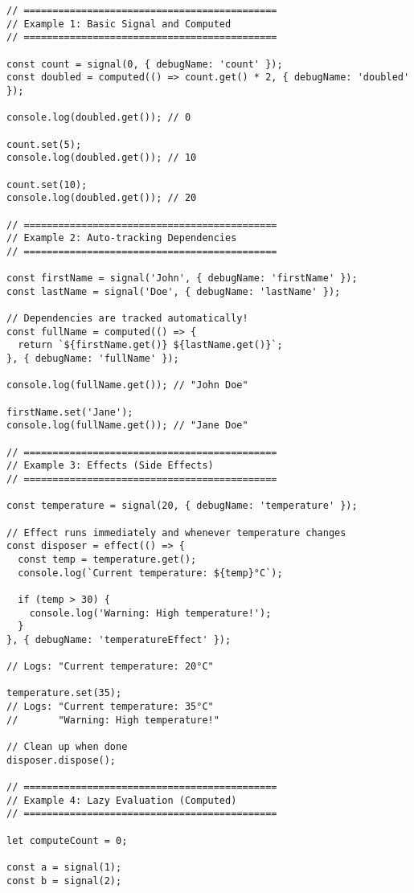 \documentclass[11pt]{article}
\begin{document}
\begin{verbatim}
// ============================================
// Example 1: Basic Signal and Computed
// ============================================

const count = signal(0, { debugName: 'count' });
const doubled = computed(() => count.get() * 2, { debugName: 'doubled' });

console.log(doubled.get()); // 0

count.set(5);
console.log(doubled.get()); // 10

count.set(10);
console.log(doubled.get()); // 20

// ============================================
// Example 2: Auto-tracking Dependencies
// ============================================

const firstName = signal('John', { debugName: 'firstName' });
const lastName = signal('Doe', { debugName: 'lastName' });

// Dependencies are tracked automatically!
const fullName = computed(() => {
  return `${firstName.get()} ${lastName.get()}`;
}, { debugName: 'fullName' });

console.log(fullName.get()); // "John Doe"

firstName.set('Jane');
console.log(fullName.get()); // "Jane Doe"

// ============================================
// Example 3: Effects (Side Effects)
// ============================================

const temperature = signal(20, { debugName: 'temperature' });

// Effect runs immediately and whenever temperature changes
const disposer = effect(() => {
  const temp = temperature.get();
  console.log(`Current temperature: ${temp}°C`);
  
  if (temp > 30) {
    console.log('Warning: High temperature!');
  }
}, { debugName: 'temperatureEffect' });

// Logs: "Current temperature: 20°C"

temperature.set(35);
// Logs: "Current temperature: 35°C"
//       "Warning: High temperature!"

// Clean up when done
disposer.dispose();

// ============================================
// Example 4: Lazy Evaluation (Computed)
// ============================================

let computeCount = 0;

const a = signal(1);
const b = signal(2);


\end{verbatim}
\end{document}
